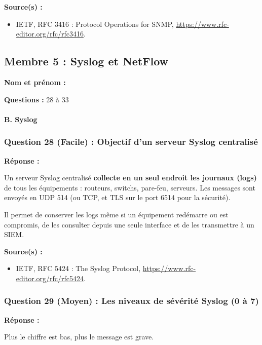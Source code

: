 \documentclass[12pt,a4paper]{article}
\newcommand{\membre}[2]{%
  \textbf{Nom et prénom :} #1 \par
  \textbf{Questions :} #2 \par
}
\newcommand{\reponse}{\textbf{Réponse :}\par}
\newcommand{\sources}{\textbf{Source(s) :}}
\begin{document}
\sources
\begin{itemize}
    \item IETF, RFC 3416 : Protocol Operations for SNMP,
    \url{https://www.rfc-editor.org/rfc/rfc3416}.
\end{itemize}

\subsection{Membre 5 : Syslog et NetFlow}
\membre{\dotfill}{28 à 33}

\paragraph{B. Syslog}

\subsubsection*{Question 28 (Facile) : Objectif d'un serveur Syslog centralisé}

\reponse
Un serveur Syslog centralisé \textbf{collecte en un seul endroit les
journaux (logs)} de tous les équipements : routeurs, switchs, pare-feu,
serveurs. Les messages sont envoyés en UDP 514 (ou TCP, et TLS sur le
port 6514 pour la sécurité).

Il permet de conserver les logs même si un équipement redémarre ou est
compromis, de les consulter depuis une seule interface et de les
transmettre à un SIEM.

\sources
\begin{itemize}
    \item IETF, RFC 5424 : The Syslog Protocol,
    \url{https://www.rfc-editor.org/rfc/rfc5424}.
\end{itemize}

\subsubsection*{Question 29 (Moyen) : Les niveaux de sévérité Syslog (0 à 7)}

\reponse
Plus le chiffre est bas, plus le message est grave.
\end{document}
